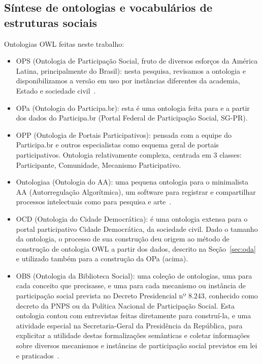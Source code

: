 \documentclass[a4paper,openright,12pt]{report} %
\begin{document}
\subsection{Síntese de ontologias e vocabulários de estruturas sociais}
Ontologias OWL feitas neste trabalho:
\begin{itemize}
	\item OPS (Ontologia de Participação Social, fruto de diversos esforços da América Latina, principalmente do Brasil): nesta pesquisa, revisamos a ontologia e disponibilizamos a versão em uso por instâncias diferentes da academia, Estado e sociedade civil~\cite{ops}.
        \item OPa (Ontologia do Participa.br): esta é uma ontologia feita para e a partir dos dados do Participa.br (Portal Federal de Participação Social, SG-PR).
        \item OPP (Ontologia de Portais Participativos): pensada com a equipe do Participa.br e outros especialistas como esquema geral de portais participativos. Ontologia relativamente complexa, centrada em 3 classes: Participante, Comunidade, Mecanismo Participativo.
        \item Ontologiaa (Ontologia do AA): uma pequena ontologia para o minimalista AA (Autorregulação Algorítmica), um software para registrar e compartilhar processos intelectuais como para pesquisa e arte~\cite{pnud5,paaper,ensaaio}.
        \item OCD (Ontologia do Cidade Democrática): é uma ontologia extensa para o portal participativo Cidade Democrática, da sociedade civil. Dado o tamanho da ontologia, o processo de sua construção deu origem ao método de construção de ontologia OWL a partir dos dados, descrito na Seção~\ref{sec:oda} e utilizado também para a construção da OPa (acima).
        \item OBS (Ontologia da Biblioteca Social): uma coleção de ontologias, uma para cada conceito que precisasse, e uma para cada mecanismo ou instância de participação social prevista no Decreto Presidencial nº 8.243, conhecido como decreto da PNPS ou da Política Nacional de Participação Social. Esta ontologia contou com entrevistas feitas diretamente para construí-la,	e uma atividade especial na Secretaria-Geral da
Presidência da República, para explicitar a utilidade
destas formalizações semânticas e coletar informações sobre
diversos mecanismos e instâncias de participação social previstos
em lei e praticados~\cite{pnud5}.
\end{itemize}
\end{document}
